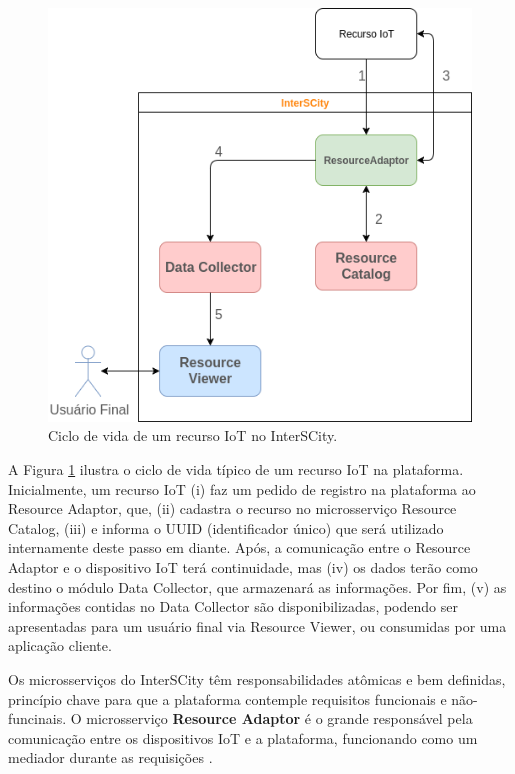 \begin{figure}
  \centering
    \includegraphics[scale=0.5]{figuras/interscity_flow.png}
  \caption{Ciclo de vida de um recurso IoT no InterSCity.}
  \label{fig:interscity-lifecycle}
\end{figure}

A Figura \ref{fig:interscity-lifecycle} ilustra o ciclo de vida típico de um
recurso IoT na plataforma. Inicialmente, um recurso IoT (i) faz um pedido de
registro na plataforma ao Resource Adaptor, que, (ii) cadastra o recurso no
microsserviço Resource Catalog, (iii) e informa o UUID
(identificador único) que será utilizado internamente deste passo em diante.
Após, a comunicação entre o Resource Adaptor e o dispositivo IoT terá
continuidade, mas (iv) os dados terão como destino o módulo Data Collector,
que armazenará as informações. Por fim, (v) as informações contidas no
Data Collector são disponibilizadas, podendo ser apresentadas para um usuário
final via Resource Viewer, ou consumidas por uma aplicação cliente.

Os microsserviços do InterSCity têm responsabilidades atômicas e bem
definidas, princípio chave para que a plataforma contemple requisitos funcionais
e não-funcinais. O microsserviço \textbf{Resource Adaptor} é o grande
responsável pela comunicação entre os dispositivos IoT e a plataforma,
funcionando como um mediador durante as requisições \cite{delesposte2017}.

